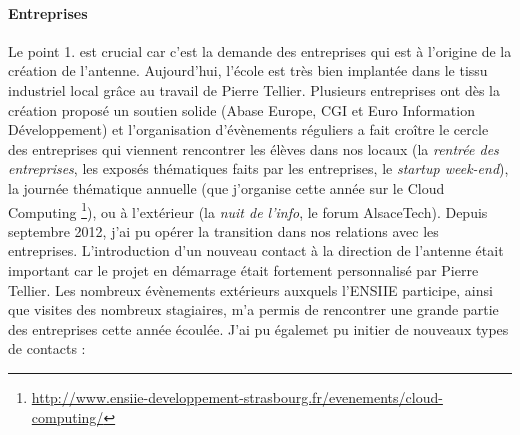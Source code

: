 \documentclass[11pt]{article}
\begin{document}
\paragraph{Entreprises} 
Le point 1. est crucial car c'est la demande des entreprises qui est à l'origine
de la création de l'antenne.  Aujourd'hui,  l'école est très bien implantée dans
le  tissu  industriel local  grâce  au  travail  de Pierre  Tellier.   Plusieurs
entreprises ont dès la création proposé  un soutien solide (Abase Europe, CGI et
Euro Information Développement) et  l'organisation d'évènements réguliers a fait
croître le  cercle des entreprises qui  viennent rencontrer les élèves  dans nos
locaux (la \emph{rentrée des entreprises}, les exposés thématiques faits par les
entreprises, le  \emph{startup week-end}),  la journée thématique  annuelle (que
j'organise cette année sur le Cloud Computing%
\footnote{\url{http://www.ensiie-developpement-strasbourg.fr/evenements/cloud-computing/}}),
ou  à l'extérieur  (la  \emph{nuit  de l'info},  le  forum AlsaceTech).   Depuis
septembre  2012, j'ai  pu  opérer  la transition  dans  nos  relations avec  les
entreprises.  L'introduction  d'un nouveau contact  à la direction  de l'antenne
était  important car  le projet  en démarrage  était fortement  personnalisé par
Pierre Tellier. Les nombreux  évènements extérieurs auxquels l'ENSIIE participe,
ainsi que visites  des nombreux stagiaires, m'a permis de  rencontrer une grande
partie des entreprises cette année écoulée. J'ai pu égalemet pu initier de nouveaux
types de contacts :
\end{document}
